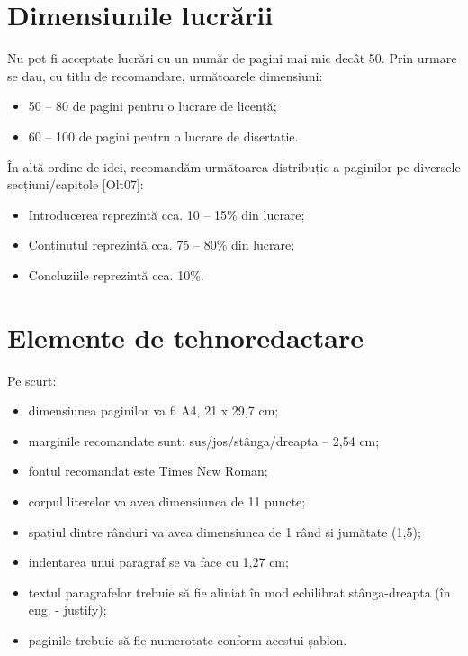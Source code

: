 \section{Dimensiunile lucrării}

Nu pot fi acceptate lucrări cu un număr de pagini mai mic decât 50. Prin urmare se dau, cu titlu de recomandare, 
următoarele dimensiuni:

\begin{itemize}
    \item 50 – 80 de pagini pentru o lucrare de licență;
    \item 60 – 100 de pagini pentru o lucrare de disertație.
\end{itemize}

În altă ordine de idei, recomandăm următoarea distribuție a paginilor pe diversele secțiuni/capitole [Olt07]:

\begin{itemize}
    \item Introducerea reprezintă cca. 10 – 15\% din lucrare;
    \item Conținutul reprezintă cca. 75 – 80\% din lucrare;
    \item Concluziile reprezintă cca. 10\%. 
\end{itemize}

\section{Elemente de tehnoredactare}

Pe scurt:

\begin{itemize}
    \item dimensiunea paginilor va fi A4, 21 x 29,7 cm; 
    \item marginile recomandate sunt: sus/jos/stânga/dreapta – 2,54 cm;
    \item fontul recomandat este Times New Roman; 
    \item corpul literelor va avea dimensiunea de 11 puncte;
    \item spațiul dintre rânduri va avea dimensiunea de 1 rând și jumătate (1,5); 
    \item indentarea unui paragraf se va face cu 1,27 cm;
    \item textul paragrafelor trebuie să fie aliniat în mod echilibrat stânga-dreapta (în eng. - justify);
    \item paginile trebuie să fie numerotate conform acestui șablon.
\end{itemize}

